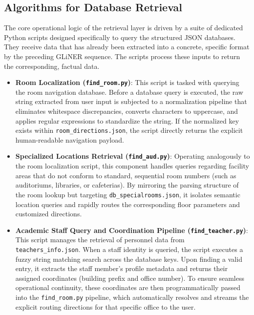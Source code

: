 \documentclass{article}
\begin{document}
\subsection{Algorithms for Database Retrieval}
The core operational logic of the retrieval layer is driven by a suite of dedicated Python scripts designed specifically to query the structured JSON databases. They receive data that has already been extracted into a concrete, specific format by the preceding GLiNER sequence. The scripts process these inputs to return the corresponding, factual data.
\begin{itemize}
    \item \textbf{Room Localization (\texttt{find\_room.py})}: 
    This script is tasked with querying the room navigation database. Before a database query is executed, the raw string extracted from user input is subjected to a normalization pipeline that eliminates whitespace discrepancies, converts characters to uppercase, and applies regular expressions to standardize the string. If the normalized key exists within \texttt{room\_directions.json}, the script directly returns the explicit human-readable navigation payload.
    
    \item \textbf{Specialized Locations Retrieval (\texttt{find\_aud.py})}: 
    Operating analogously to the room localization script, this component handles queries regarding facility areas that do not conform to standard, sequential room numbers (such as auditoriums, libraries, or cafeterias). By mirroring the parsing structure of the room lookup but targeting \texttt{db\_specialrooms.json}, it isolates semantic location queries and rapidly routes the corresponding floor parameters and customized directions.
    
    \item \textbf{Academic Staff Query and Coordination Pipeline (\texttt{find\_teacher.py})}: 
    This script manages the retrieval of personnel data from \texttt{teachers\_info.json}. When a staff identity is queried, the script executes a fuzzy string matching search across the database keys. Upon finding a valid entry, it extracts the staff member's profile metadata and returns their assigned coordinates (building prefix and office number). To ensure seamless operational continuity, these coordinates are then programmatically passed into the \texttt{find\_room.py} pipeline, which automatically resolves and streams the explicit routing directions for that specific office to the user.
\end{itemize}
\end{document}
